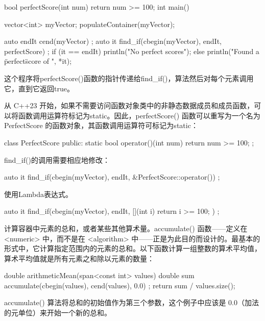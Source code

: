 \begin{cpp}
bool perfectScore(int num) { return num >= 100; }
int main()
{
    vector<int> myVector;
    populateContainer(myVector);

    auto endIt { cend(myVector) };
    auto it { find_if(cbegin(myVector), endIt, perfectScore) };
    if (it == endIt) {
        println("No perfect scores");
    } else {
        println("Found a \"perfect\" score of {}", *it);
    }
}
\end{cpp}

这个程序将perfectScore()函数的指针传递给find\_if()，算法然后对每个元素调用它，直到它返回true。


从 C++23 开始，如果不需要访问函数对象类中的非静态数据成员和成员函数，可以将函数调用运算符标记为static。因此，perfectScore() 函数可以重写为一个名为 PerfectScore 的函数对象，其函数调用运算符可标记为static：

\begin{cpp}
class PerfectScore
{
    public:
        static bool operator()(int num) { return num >= 100; }
};
\end{cpp}

find\_if()的调用需要相应地修改：

\begin{cpp}
auto it { find_if(cbegin(myVector), endIt, &PerfectScore::operator()) };
\end{cpp}

使用Lambda表达式。

\begin{cpp}
auto it { find_if(cbegin(myVector), endIt, [](int i){ return i >= 100; }) };
\end{cpp}



计算容器中元素的总和，或者某些其他算术量。accumulate() 函数——定义在 <numeric> 中，而不是在 <algorithm> 中——正是为此目的而设计的。最基本的形式中，它计算指定范围内的元素的总和。以下函数计算一组整数的算术平均值，算术平均值就是所有元素之和除以元素的数量：

\begin{cpp}
double arithmeticMean(span<const int> values)
{
    double sum { accumulate(cbegin(values), cend(values), 0.0) };
    return sum / values.size();
}
\end{cpp}

accumulate() 算法将总和的初始值作为第三个参数，这个例子中应该是 0.0（加法的元单位）来开始一个新的总和。

